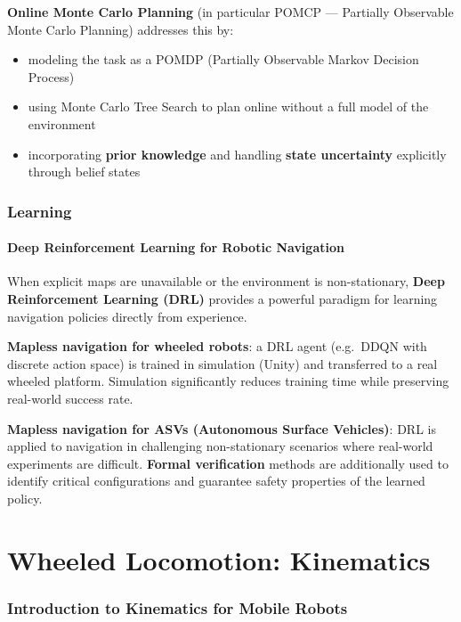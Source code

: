 \documentclass[11pt,a4paper]{article}
\theoremstyle{definition}
\theoremstyle{plain}
\theoremstyle{remark}
\begin{document}
\textbf{Online Monte Carlo Planning} (in particular POMCP — Partially Observable Monte Carlo Planning) addresses this by:
\begin{itemize}
    \item modeling the task as a POMDP (Partially Observable Markov Decision Process)
    \item using Monte Carlo Tree Search to plan online without a full model of the environment
    \item incorporating \textbf{prior knowledge} and handling \textbf{state uncertainty} explicitly through belief states
\end{itemize}

\section{Learning}

\subsection{Deep Reinforcement Learning for Robotic Navigation}

When explicit maps are unavailable or the environment is non-stationary, \textbf{Deep Reinforcement Learning (DRL)} provides a powerful paradigm for learning navigation policies directly from experience.

\textbf{Mapless navigation for wheeled robots}: a DRL agent (e.g.\ DDQN with discrete action space) is trained in simulation (Unity) and transferred to a real wheeled platform. Simulation significantly reduces training time while preserving real-world success rate.

\textbf{Mapless navigation for ASVs (Autonomous Surface Vehicles)}: DRL is applied to navigation in challenging non-stationary scenarios where real-world experiments are difficult. \textbf{Formal verification} methods are additionally used to identify critical configurations and guarantee safety properties of the learned policy.




\part{Wheeled Locomotion: Kinematics}

\section{Introduction to Kinematics for Mobile Robots}
\end{document}
